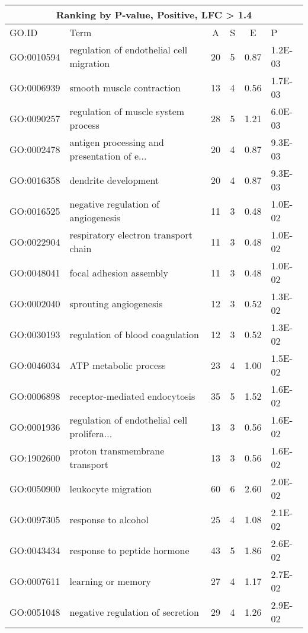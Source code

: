\begin{table}[ht]
\centering
\begin{tabular}{llcccl}
\multicolumn{6}{c}{\bf Ranking by P-value, Positive, LFC > 1.4} \\
  \hline
GO.ID & Term & A & S & E & P \\ 
  \hline
GO:0010594 & regulation of endothelial cell migration &  20 &   5 & 0.87 & 1.2E-03 \\ 
  GO:0006939 & smooth muscle contraction &  13 &   4 & 0.56 & 1.7E-03 \\ 
  GO:0090257 & regulation of muscle system process &  28 &   5 & 1.21 & 6.0E-03 \\ 
  GO:0002478 & antigen processing and presentation of e... &  20 &   4 & 0.87 & 9.3E-03 \\ 
  GO:0016358 & dendrite development &  20 &   4 & 0.87 & 9.3E-03 \\ 
  GO:0016525 & negative regulation of angiogenesis &  11 &   3 & 0.48 & 1.0E-02 \\ 
  GO:0022904 & respiratory electron transport chain &  11 &   3 & 0.48 & 1.0E-02 \\ 
  GO:0048041 & focal adhesion assembly &  11 &   3 & 0.48 & 1.0E-02 \\ 
  GO:0002040 & sprouting angiogenesis &  12 &   3 & 0.52 & 1.3E-02 \\ 
  GO:0030193 & regulation of blood coagulation &  12 &   3 & 0.52 & 1.3E-02 \\ 
  GO:0046034 & ATP metabolic process &  23 &   4 & 1.00 & 1.5E-02 \\ 
  GO:0006898 & receptor-mediated endocytosis &  35 &   5 & 1.52 & 1.6E-02 \\ 
  GO:0001936 & regulation of endothelial cell prolifera... &  13 &   3 & 0.56 & 1.6E-02 \\ 
  GO:1902600 & proton transmembrane transport &  13 &   3 & 0.56 & 1.6E-02 \\ 
  GO:0050900 & leukocyte migration &  60 &   6 & 2.60 & 2.0E-02 \\ 
  GO:0097305 & response to alcohol &  25 &   4 & 1.08 & 2.1E-02 \\ 
  GO:0043434 & response to peptide hormone &  43 &   5 & 1.86 & 2.6E-02 \\ 
  GO:0007611 & learning or memory &  27 &   4 & 1.17 & 2.7E-02 \\ 
  GO:0051048 & negative regulation of secretion &  29 &   4 & 1.26 & 2.9E-02 \\ 

\end{tabular}
\end{table}
